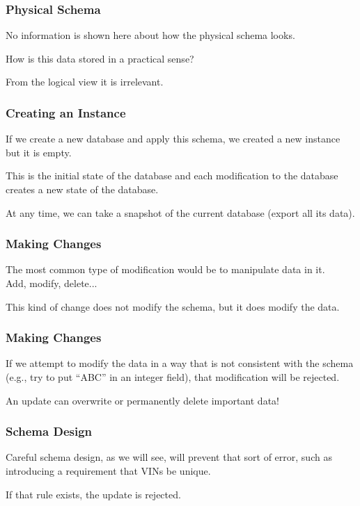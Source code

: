 \begin{frame}
\frametitle{Physical Schema}

No information is shown here about how the physical schema looks. 

How is this data stored in a practical sense? 

From the logical view it is irrelevant.

\end{frame}



\begin{frame}
\frametitle{Creating an Instance}

If we create a new database and apply this schema, we created a new instance but it is empty. 

This is the initial state of the database and each modification to the database creates a new state of the database.

At any time, we can take a snapshot of the current database (export all its data). 

\end{frame}



\begin{frame}
\frametitle{Making Changes}

The most common type of modification would be to manipulate data in it.\\
\quad Add, modify, delete...

This kind of change does not modify the schema, but it does modify the data.

\end{frame}



\begin{frame}
\frametitle{Making Changes}

If we attempt to modify the data in a way that is not consistent with the schema (e.g., try to put ``ABC'' in an integer field), that modification will be rejected.

An update can overwrite or permanently delete important data!

\end{frame}



\begin{frame}
\frametitle{Schema Design}

Careful schema design, as we will see, will prevent that sort of error, such as introducing a requirement that VINs be unique. 

If that rule exists, the update is rejected. 


\end{frame}



